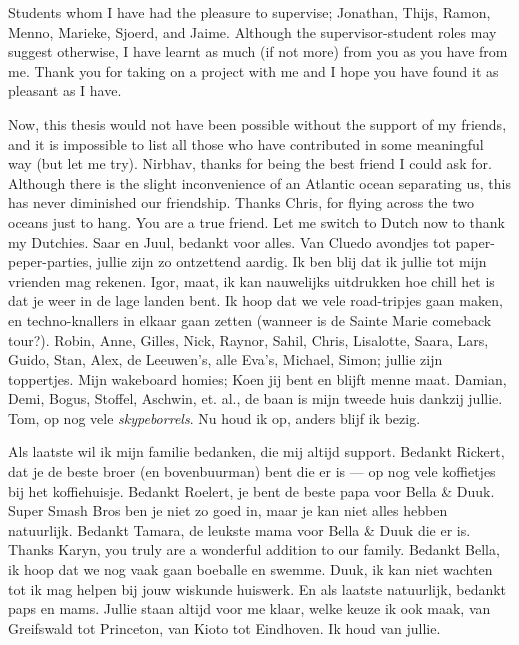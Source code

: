 \begin{CJK}{UTF8}{min}
Students whom I have had the pleasure to supervise; Jonathan, Thijs, Ramon, Menno, Marieke, Sjoerd, and Jaime. Although the supervisor-student roles may suggest otherwise, I have learnt as much (if not more) from you as you have from me. Thank you for taking on a project with me and I hope you have found it as pleasant as I have. \par 

Now, this thesis would not have been possible without the support of my friends, and it is impossible to list all those who have contributed in some meaningful way (but let me try). Nirbhav, thanks for being the best friend I could ask for. Although there is the slight inconvenience of an Atlantic ocean separating us, this has never diminished our friendship. Thanks Chris, for flying across the two oceans just to hang. You are a true friend. Let me switch to Dutch now to thank my Dutchies. Saar en Juul, bedankt voor alles. Van Cluedo avondjes tot paper-peper-parties, jullie zijn zo ontzettend aardig. Ik ben blij dat ik jullie tot mijn vrienden mag rekenen. Igor, maat, ik kan nauwelijks uitdrukken hoe chill het is dat je weer in de lage landen bent. Ik hoop dat we vele road-tripjes gaan maken, en techno-knallers in elkaar gaan zetten (wanneer is de Sainte Marie comeback tour?). Robin, Anne, Gilles, Nick, Raynor, Sahil, Chris, Lisalotte, Saara, Lars, Guido, Stan, Alex, de Leeuwen's, alle Eva's, Michael, Simon; jullie zijn toppertjes. Mijn wakeboard homies; Koen jij bent en blijft menne maat. Damian, Demi, Bogus, Stoffel, Aschwin, et. al., de baan is mijn tweede huis dankzij jullie. Tom, op nog vele {\it skypeborrels}. Nu houd ik op, anders blijf ik bezig. \par 

Als laatste wil ik mijn familie bedanken, die mij altijd support. Bedankt Rickert, dat je de beste broer (en bovenbuurman) bent die er is — op nog vele koffietjes bij het koffiehuisje. Bedankt Roelert, je bent de beste papa voor Bella \& Duuk. Super Smash Bros ben je niet zo goed in, maar je kan niet alles hebben natuurlijk. Bedankt Tamara, de leukste mama voor Bella \& Duuk die er is. Thanks Karyn, you truly are a wonderful addition to our family. Bedankt Bella, ik hoop dat we nog vaak gaan boeballe en swemme. Duuk, ik kan niet wachten tot ik mag helpen bij jouw wiskunde huiswerk. En als laatste natuurlijk, bedankt paps en mams. Jullie staan altijd voor me klaar, welke keuze ik ook maak, van Greifswald tot Princeton, van Kioto tot Eindhoven. \newline \newline
Ik houd van jullie.
\end{CJK}